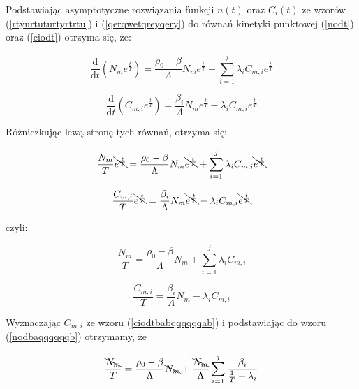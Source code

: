 Podstawiając asymptotyczne rozwiązania funkcji $n(t)$ oraz $C_i(t)$ ze wzorów (\ref{rtyurtuturtyrtrtu}) i (\ref{qerqwetqreyqery}) do równań kinetyki punktowej (\ref{nodt}) oraz (\ref{ciodt}) otrzyma się, że:

\begin{equation}
	\frac{\mathrm{d}}{\mathrm{d}t}(N_me^{\frac{t}{T}})=\frac{\rho_0-\beta}{\Lambda}N_me^{\frac{t}{T}}+\sum_{i=1}^{j} \lambda_iC_{m,i}e^{\frac{t}{T}} 
	\label{nodtabababab}
\end{equation}

\begin{equation}
	\frac{\mathrm{d}}{\mathrm{d}t}(C_{m,i}e^{\frac{t}{T}})=\frac{\beta_i}{\Lambda}N_me^{\frac{t}{T}}-\lambda_iC_{m,i}e^{\frac{t}{T}}
	\label{ciodtababababab}
\end{equation}

\noindent Różniczkując lewą stronę tych równań, otrzyma się:

\begin{equation}
	\frac{N_m}{T}\bcancel{e^{\frac{t}{T}}}=\frac{\rho_0-\beta}{\Lambda}N_m\bcancel{e^{\frac{t}{T}}}+\sum_{i=1}^{j} \lambda_iC_{m,i}\bcancel{e^{\frac{t}{T}}}
	\label{nodbab}
\end{equation}

\begin{equation}
	\frac{C_{m,i}}{T}\bcancel{e^{\frac{t}{T}}}=\frac{\beta_i}{\Lambda}N_m\bcancel{e^{\frac{t}{T}}}-\lambda_iC_{m,i}\bcancel{e^{\frac{t}{T}}}
	\label{ciodtbabab}
\end{equation}

\noindent czyli:

\begin{equation}
	\frac{N_m}{T}=\frac{\rho_0-\beta}{\Lambda}N_m+\sum_{i=1}^{j} \lambda_iC_{m,i}
	\label{nodbaqqqqqqb}
\end{equation}

\begin{equation}
	\frac{C_{m,i}}{T}=\frac{\beta_i}{\Lambda}N_m-\lambda_iC_{m,i}
	\label{ciodtbabqqqqqqab}
\end{equation}

\noindent Wyznaczając $C_{m,i}$ ze wzoru (\ref{ciodtbabqqqqqqab}) i podstawiając do wzoru (\ref{nodbaqqqqqqb}) otrzymamy, że

\begin{equation}
	\frac{\bcancel{N_m}}{T}=\frac{\rho_0-\beta}{\Lambda}\bcancel{N_m}+\frac{\bcancel{N_m}}{\Lambda}\sum_{i=1}^{j} \frac{\beta_i}{\frac{1}{T}+\lambda_i}
	\label{nodbwewewrwtwyaqqqqqqb}
\end{equation}

